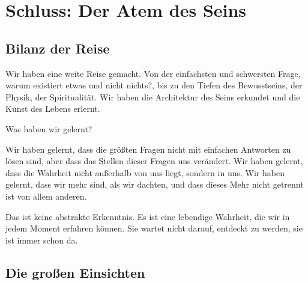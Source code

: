 
\chapter{Schluss: Der Atem des Seins}

\section{Bilanz der Reise}

Wir haben eine weite Reise gemacht. Von der einfachsten und schwersten Frage, warum existiert etwas und nicht nichts?, bis zu den Tiefen des Bewusstseins, der Physik, der Spiritualität. Wir haben die Architektur des Seins erkundet und die Kunst des Lebens erlernt.

Was haben wir gelernt?

Wir haben gelernt, dass die größten Fragen nicht mit einfachen Antworten zu lösen sind, aber dass das Stellen dieser Fragen uns verändert. Wir haben gelernt, dass die Wahrheit nicht außerhalb von uns liegt, sondern in uns. Wir haben gelernt, dass wir mehr sind, als wir dachten, und dass dieses Mehr nicht getrennt ist von allem anderen.

Das ist keine abstrakte Erkenntnis. Es ist eine lebendige Wahrheit, die wir in jedem Moment erfahren können. Sie wartet nicht darauf, \glqq entdeckt\grqq{} zu werden, sie ist immer schon da.

\section{Die großen Einsichten}

